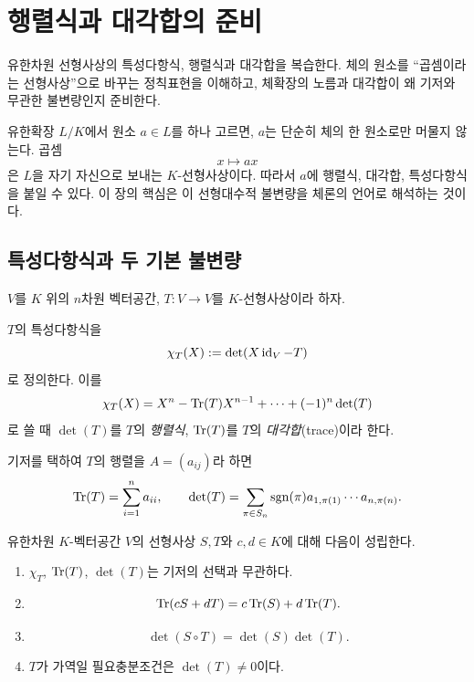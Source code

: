 \section{행렬식과 대각합의 준비}
\label{sec:norm-trace-linear-algebra}

\begin{learninggoal}
유한차원 선형사상의 특성다항식, 행렬식과 대각합을 복습한다. 체의 원소를 ``곱셈이라는 선형사상''으로 바꾸는 정칙표현을 이해하고, 체확장의 노름과 대각합이 왜 기저와 무관한 불변량인지 준비한다.
\end{learninggoal}

유한확장 $L/K$에서 원소 $a\in L$를 하나 고르면, $a$는 단순히 체의 한 원소로만 머물지 않는다. 곱셈
\[
  x\longmapsto ax
\]
은 $L$을 자기 자신으로 보내는 $K$-선형사상이다. 따라서 $a$에 행렬식, 대각합, 특성다항식을 붙일 수 있다. 이 장의 핵심은 이 선형대수적 불변량을 체론의 언어로 해석하는 것이다.

\subsection{특성다항식과 두 기본 불변량}

$V$를 $K$ 위의 $n$차원 벡터공간, $T:V\to V$를 $K$-선형사상이라 하자.

\begin{definition}
$T$의 특성다항식을
\[
  \chi_T(X):=\det(X\operatorname{id}_V-T)
\]
로 정의한다. 이를
\[
  \chi_T(X)
  =X^n-\operatorname{Tr}(T)X^{n-1}+\cdots+(-1)^n\det(T)
\]
로 쓸 때 $\det(T)$를 $T$의 \emph{행렬식}, $\operatorname{Tr}(T)$를 $T$의
\emph{대각합}(trace)이라 한다.
\end{definition}

기저를 택하여 $T$의 행렬을 $A=(a_{ij})$라 하면
\[
  \operatorname{Tr}(T)=\sum_{i=1}^n a_{ii},
  \qquad
  \det(T)=\sum_{\pi\in S_n}
  \operatorname{sgn}(\pi)a_{1,\pi(1)}\cdots a_{n,\pi(n)}.
\]

\begin{proposition}[기저 독립성과 기본 공식]
\label{prop:linear-trace-det-properties}
유한차원 $K$-벡터공간 $V$의 선형사상 $S,T$와 $c,d\in K$에 대해 다음이 성립한다.
\begin{enumerate}[label=(\roman*)]
  \item $\chi_T$, $\operatorname{Tr}(T)$, $\det(T)$는 기저의 선택과 무관하다.
  \item
  \[
    \operatorname{Tr}(cS+dT)=c\operatorname{Tr}(S)+d\operatorname{Tr}(T).
  \]
  \item
  \[
    \det(S\circ T)=\det(S)\det(T).
  \]
  \item $T$가 가역일 필요충분조건은 $\det(T)\ne0$이다.
\end{enumerate}
\end{proposition}

